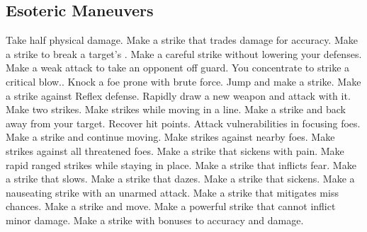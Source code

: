 
\small
\subsection{Esoteric Maneuvers}\label{Esoteric Maneuvers}
\begin{spelllist}
 Take half physical damage.
 Make a strike that trades damage for accuracy.
 Make a strike to break a target's .
 Make a careful strike without lowering your defenses.
 Make a weak attack to take an opponent off guard.
 You concentrate to strike a critical blow..
 Knock a foe prone with brute force.
 Jump and make a strike.
 Make a strike against Reflex defense.
 Rapidly draw a new weapon and attack with it.
 Make two strikes.
 Make strikes while moving in a line.
 Make a strike and back away from your target.
 Recover hit points.
 Attack vulnerabilities in focusing foes.
 Make a strike and continue moving.
 Make strikes against nearby foes.
 Make strikes against all threatened foes.
 Make a strike that sickens with pain.
 Make rapid ranged strikes while staying in place.
 Make a strike that inflicts fear.
 Make a strike that slows.
 Make a strike that dazes.
 Make a strike that sickens.
 Make a nauseating strike with an unarmed attack.
 Make a strike that mitigates miss chances.
 Make a strike and move.
 Make a powerful strike that cannot inflict minor damage.
 Make a strike with bonuses to accuracy and damage.
\end{spelllist}



\small
